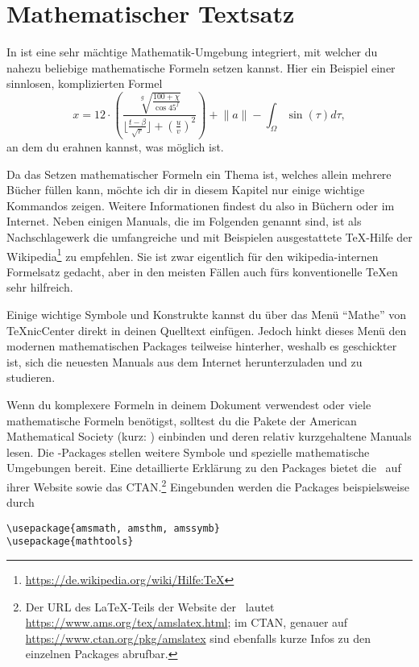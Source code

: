 %
%
\chapter{Mathematischer Textsatz}

In \DMLLaTeX{} ist eine sehr mächtige Mathematik-Umgebung integriert, mit welcher du nahezu beliebige mathematische Formeln setzen kannst. Hier ein Beispiel einer sinnlosen, komplizierten Formel
\begin{equation}
	x = 12 \cdot \left( \frac{
		\sqrt[g]{ \frac{ 100 + \chi }{ \cos 45^{f} } }
	}{
		\lfloor \frac{ t - \beta }{ \sqrt{ r } } \rfloor
		+ \left( \frac uv \right)^2
	} \right) + \lVert a\rVert - \int_\Omega \sin(\tau) d\tau,
\end{equation}
an dem du erahnen kannst, was möglich ist.

Da das Setzen mathematischer Formeln ein Thema ist, welches allein mehrere Bücher füllen kann, möchte ich dir in diesem Kapitel nur einige wichtige Kommandos zeigen. Weitere Informationen findest du also in Büchern oder im Internet. Neben einigen Manuals, die im Folgenden genannt sind, ist als Nachschlagewerk die umfangreiche und mit Beispielen ausgestattete \TeX-Hilfe der Wikipedia\footnote{\href{https://de.wikipedia.org/wiki/Hilfe:TeX}{https://de.wikipedia.org/wiki/Hilfe:TeX}} zu empfehlen. Sie ist zwar eigentlich für den wikipedia-internen Formelsatz gedacht, aber in den meisten Fällen auch fürs konventionelle \TeX{}en sehr hilfreich.

Einige wichtige Symbole und Konstrukte kannst du über das Menü \enquote{Mathe} von TeXnicCenter direkt in deinen Quelltext einfügen. Jedoch hinkt dieses Menü den modernen mathematischen Packages teilweise hinterher, weshalb es geschickter ist, sich die neuesten Manuals aus dem Internet herunterzuladen und zu studieren.

Wenn du komplexere Formeln in deinem Dokument verwendest oder viele mathematische Formeln benötigst, solltest du die Pakete der American Mathematical Society (kurz: \AmS) einbinden und deren relativ kurzgehaltene Manuals lesen. Die \AmSmath-Packages stellen weitere Symbole und spezielle mathematische Umgebungen bereit. Eine detaillierte Erklärung zu den Packages bietet die \AmS\ auf ihrer Website sowie das CTAN.\footnote{Der URL des {\rmfamily\LaTeX}-Teils der Website der \AmS\ lautet \href{https://www.ams.org/tex/amslatex.html}{https://www.ams.org/tex/amslatex.html}; im CTAN, genauer auf \href{https://www.ctan.org/pkg/amslatex}{https://www.ctan.org/pkg/amslatex} sind ebenfalls kurze Infos zu den einzelnen Packages abrufbar.} Eingebunden werden die Packages beispielsweise durch
\begin{lstlisting}
\usepackage{amsmath, amsthm, amssymb}
\usepackage{mathtools}
\end{lstlisting}

